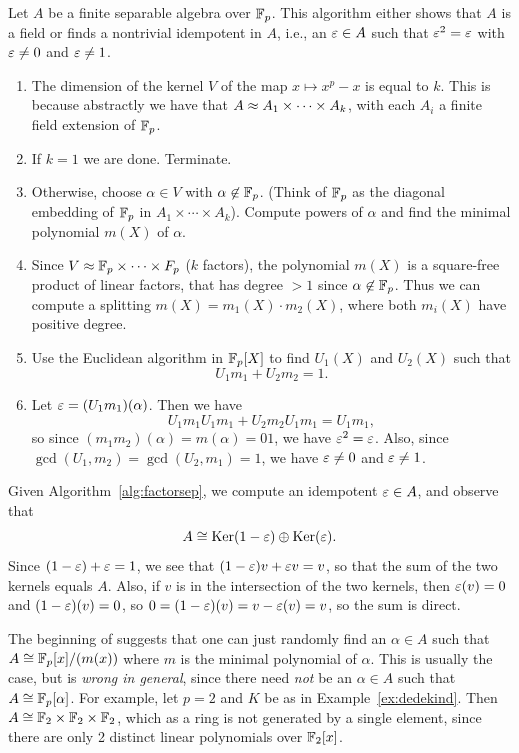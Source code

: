 \begin{algorithm}\label{alg:factorsep}
Let $A$ be a finite separable algebra over $\mathbb{F}_p$.  This
algorithm either shows that $A$ is a field or finds
a nontrivial idempotent in $A$, i.e., an $\varepsilon\in A$
such that $\varepsilon^2 = \varepsilon$ with $\varepsilon\neq 0$ and $\varepsilon\neq 1$.
\begin{enumerate}
\item The dimension of the kernel $V$ of the map $x\mapsto x^p - x$ is
  equal to $k$.  This is because abstractly we have that $A\approx
  A_1\times \cdots \times A_k$, with each $A_i$ a finite field
  extension of $\mathbb{F}_p$.
\item If $k=1$ we are done.  Terminate. 
\item Otherwise, choose $\alpha \in V$ with $\alpha \not\in \mathbb{F}_p$.
(Think of $\mathbb{F}_p$ as the diagonal embedding of $\mathbb{F}_p$ in 
$A_1\times \cdots \times A_k$).
Compute powers of $\alpha$ and find the minimal polynomial $m(X)$
of $\alpha$.  
\item Since $V\approx \mathbb{F}_p \times \cdots \times F_p$ ($k$ factors),
the polynomial $m(X)$ is a square-free product of linear factors, that
has degree $>1$ since $\alpha\not\in\mathbb{F}_p$.  Thus we can compute
a splitting $m(X) = m_1(X) \cdot m_2(X)$, where both $m_i(X)$ have
positive degree. 
\item Use the Euclidean algorithm in $\mathbb{F}_p[X]$ to find 
$U_1(X)$ and $U_2(X)$ such that 
$$
  U_1 m_1 + U_2 m_2 = 1.
$$
\item Let $\varepsilon = (U_1 m_1)(\alpha)$.  Then we have
$$
  U_1 m_1 U_1 m_1 + U_2 m_2 U_1 m_1 = U_1 m_1,
$$
so since $(m_1 m_2)(\alpha) = m(\alpha)=01$, we have $\varepsilon^2 = \varepsilon$.
Also, since $\gcd(U_1, m_2) = \gcd(U_2, m_1) = 1$,
we have $\varepsilon\neq 0$ and $\varepsilon \neq 1$. 
\end{enumerate}
\end{algorithm}

Given Algorithm~\ref{alg:factorsep}, we compute an idempotent
$\varepsilon \in A$, and observe that
$$
 A \cong \operatorname{Ker}(1 - \varepsilon)  \oplus \operatorname{Ker}(\varepsilon).
$$
Since $(1 - \varepsilon) + \varepsilon = 1$, we see that 
$(1 - \varepsilon)v + \varepsilon v = v$, so that the sum
of the two kernels equals $A$.  
Also, if $v$ is in the intersection of the two kernels,
then $\varepsilon(v) = 0$ and $(1-\varepsilon)(v) =0$, so 
$0 = (1-\varepsilon)(v) = v - \varepsilon(v) = v$, so the sum is direct.

\begin{remark}
  The beginning of \cite[\S6.2.4]{cohen:course_ant} suggests that one
  can just randomly find an $\alpha \in A$ such that $A\cong
  \mathbb{F}_p[x]/(m(x))$ where $m$ is the minimal polynomial of $\alpha$.
  This is usually the case, but is {\em wrong in general}, since there
  need {\em not} be an $\alpha \in A$ such that $A \cong
  \mathbb{F}_p[\alpha]$.  For example, let $p=2$ and $K$ be as in
  Example~\ref{ex:dedekind}.  Then $A\cong \mathbb{F}_2 \times \mathbb{F}_2 \times
  \mathbb{F}_2$, which as a ring is not generated by a single element, since
  there are only 2 distinct linear polynomials over $\mathbb{F}_2[x]$.
\end{remark}

